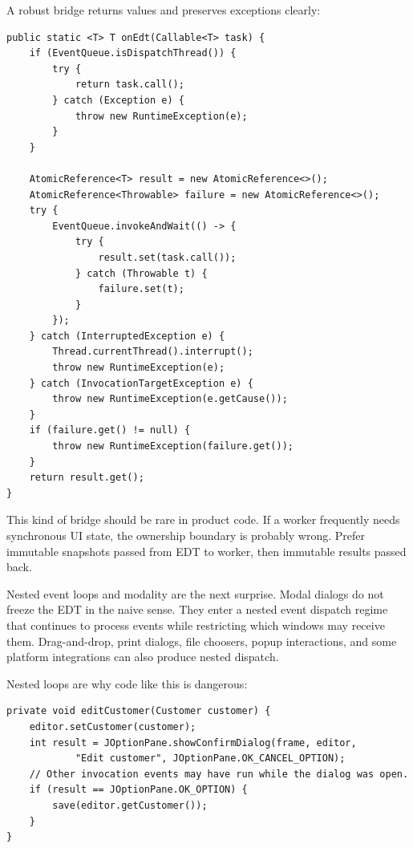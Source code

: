 A robust bridge returns values and preserves exceptions clearly:

\begin{lstlisting}[caption={A small synchronous EDT bridge for tests and integration code.}]
public static <T> T onEdt(Callable<T> task) {
    if (EventQueue.isDispatchThread()) {
        try {
            return task.call();
        } catch (Exception e) {
            throw new RuntimeException(e);
        }
    }

    AtomicReference<T> result = new AtomicReference<>();
    AtomicReference<Throwable> failure = new AtomicReference<>();
    try {
        EventQueue.invokeAndWait(() -> {
            try {
                result.set(task.call());
            } catch (Throwable t) {
                failure.set(t);
            }
        });
    } catch (InterruptedException e) {
        Thread.currentThread().interrupt();
        throw new RuntimeException(e);
    } catch (InvocationTargetException e) {
        throw new RuntimeException(e.getCause());
    }
    if (failure.get() != null) {
        throw new RuntimeException(failure.get());
    }
    return result.get();
}
\end{lstlisting}

This kind of bridge should be rare in product code. If a worker frequently needs synchronous UI state, the ownership boundary is probably wrong. Prefer immutable snapshots passed from EDT to worker, then immutable results passed back.

Nested event loops and modality are the next surprise. Modal dialogs do not freeze the EDT in the naive sense. They enter a nested event dispatch regime that continues to process events while restricting which windows may receive them. Drag-and-drop, print dialogs, file choosers, popup interactions, and some platform integrations can also produce nested dispatch.

Nested loops are why code like this is dangerous:

\begin{lstlisting}[caption={A modal dialog can allow unrelated EDT work to run before this method returns.}]
private void editCustomer(Customer customer) {
    editor.setCustomer(customer);
    int result = JOptionPane.showConfirmDialog(frame, editor,
            "Edit customer", JOptionPane.OK_CANCEL_OPTION);
    // Other invocation events may have run while the dialog was open.
    if (result == JOptionPane.OK_OPTION) {
        save(editor.getCustomer());
    }
}
\end{lstlisting}


